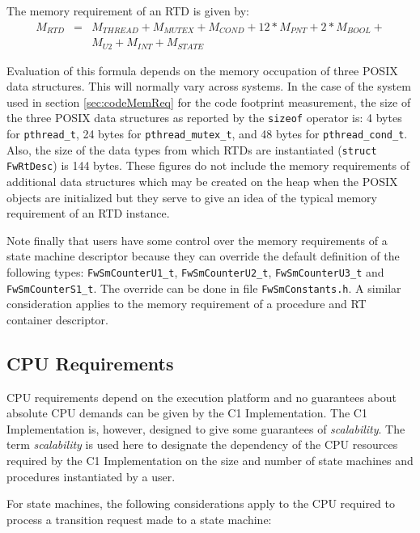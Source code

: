 \documentclass[a4paper,10pt]{article}
\begin{document}
The memory requirement of an RTD is given by:
\begin{eqnarray*}
M_{RTD} & = & M_{THREAD} + M_{MUTEX} + M_{COND} + 12 * M_{PNT} + 2 * M_{BOOL} + \\
        &   & M_{U2} + M_{INT} + M_{STATE}
\end{eqnarray*}

Evaluation of this formula depends on the memory occupation of three POSIX data structures. This will normally vary across systems. In the case of the system used in section \ref{sec:codeMemReq} for the code footprint measurement, the size of the three POSIX data structures as reported by the \texttt{sizeof} operator is: 4 bytes for \texttt{pthread\_t}, 24 bytes for \texttt{pthread\_mutex\_t}, and 48 bytes for \texttt{pthread\_cond\_t}. Also, the size of the data types from which RTDs are instantiated (\texttt{struct FwRtDesc}) is 144 bytes. These figures do not include the memory requirements of additional data structures which may be created on the heap when the POSIX objects are initialized  but they serve to give an idea of the typical memory requirement of an RTD instance.

Note finally that users have some control over the memory requirements of a state machine 
descriptor because they can override the 
default definition of the following types: \texttt{FwSmCounterU1\_t}, \texttt{FwSmCounterU2\_t}, \texttt{FwSmCounterU3\_t} and 
\texttt{FwSmCounterS1\_t}. The override can be done in file \texttt{FwSmConstants.h}.
A similar consideration applies to the memory requirement of a procedure and RT container descriptor.

\subsection{CPU Requirements}
CPU requirements depend on the execution platform and no guarantees about absolute CPU demands can be given 
by the C1 Implementation. 
The C1 Implementation is, however, designed to give some guarantees of \emph{scalability}. 
The term \emph{scalability} is used here to designate 
the dependency of the CPU resources required by the C1 Implementation on the size and number of state machines 
and procedures instantiated by a user. 

For state machines, the following considerations apply to the CPU required to process a transition 
request made to a state machine:
\end{document}
